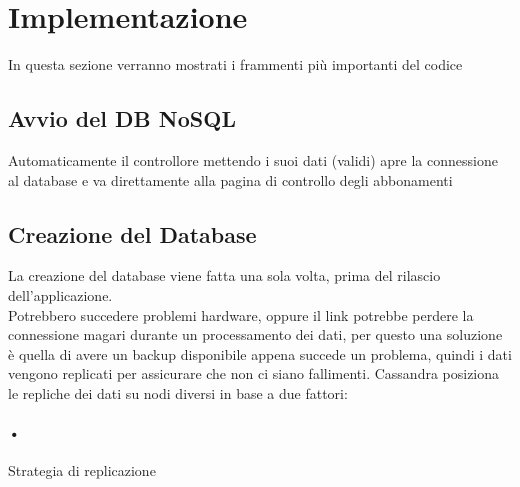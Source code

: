 \section{Implementazione}

In questa sezione verranno mostrati i frammenti più importanti del codice
\lstset{style=mystyle}
\subsection{Avvio del DB NoSQL}


Automaticamente il controllore mettendo i suoi dati (validi) apre la connessione al database e va direttamente alla pagina di controllo degli abbonamenti
\subsection{Creazione del Database}


La creazione del database viene fatta una sola volta, prima del rilascio dell'applicazione. 
\\Potrebbero succedere problemi hardware, oppure il link potrebbe perdere la connessione magari durante un processamento dei dati, per questo una soluzione è quella di avere un backup disponibile appena succede un problema, quindi i dati vengono replicati per assicurare che non ci siano fallimenti. Cassandra posiziona le repliche dei dati su nodi diversi in base a due fattori:
\paragraph{•} Strategia di replicazione
